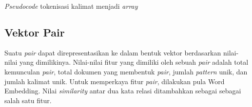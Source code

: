 \begin{kode}
  
  
  \caption{\textit{Pseudocode} tokenisasi kalimat menjadi \textit{array}}
  \label{code:pembentukan-stree}
\end{kode}
%
%
% 
%

\subsection{Vektor Pair}
Suatu \textit{pair} dapat direpresentasikan ke dalam bentuk vektor berdasarkan nilai-nilai yang dimilikinya. Nilai-nilai fitur yang dimiliki oleh sebuah \textit{pair} adalah total kemunculan \textit{pair}, total dokumen yang membentuk \textit{pair}, jumlah \textit{pattern} unik, dan jumlah kalimat unik. Untuk memperkaya fitur \textit{pair}, dilakukan pula Word Embedding. Nilai \textit{similarity} antar dua kata relasi ditambahkan sebagai sebagai salah satu fitur.

